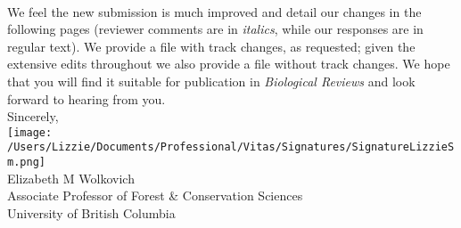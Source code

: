 \documentclass[11pt,a4paper]{letter}
\begin{document}
\begin{letter}{}
\vspace{1.5ex}\\
We feel the new submission is much improved and detail our changes in the following pages (reviewer comments are in \emph{italics}, while our responses are in regular text). We provide a file with track changes, as requested; given the extensive edits throughout we also provide a file without track changes. We hope that you will find it suitable for publication in \emph{Biological Reviews} and look forward to hearing from you.
\vspace{1.5ex}\\
Sincerely,\\
\texttt{[image: /Users/Lizzie/Documents/Professional/Vitas/Signatures/SignatureLizzieSm.png]} \\
Elizabeth M Wolkovich\\
Associate Professor of Forest \& Conservation Sciences\\ 
University of British Columbia
\end{letter}
\end{document}

